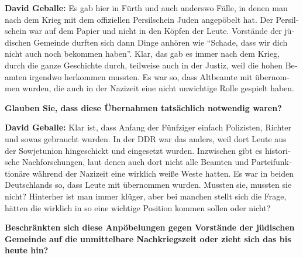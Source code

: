 \begin{otherlanguage}{ngerman}
\textbf{David Geballe:} Es gab hier in Fürth und auch anderswo Fälle, in denen man nach dem Krieg mit dem offiziellen Persilschein Juden angepöbelt hat. Der Persilschein war auf dem Papier und nicht in den Köpfen der Leute. Vorstände der jüdischen Gemeinde durften sich dann Dinge anhören wie "`Schade, dass wir dich nicht auch noch bekommen haben"'. Klar, das gab es immer nach dem Krieg, durch die ganze Geschichte durch, teilweise auch in der Justiz, weil die hohen Beamten irgendwo herkommen mussten. Es war so, dass Altbeamte mit übernommen wurden, die auch in der Nazizeit eine nicht unwichtige Rolle gespielt haben. 

\textbf{Glauben Sie, dass diese Übernahmen tatsächlich notwendig waren?} 

\textbf{David Geballe:} Klar ist, dass Anfang der Fünfziger einfach Polizisten, Richter und sowas gebraucht wurden. In der DDR war das anders, weil dort Leute aus der Sowjetunion hingeschickt und eingesetzt wurden. Inzwischen gibt es historische Nachforschungen, laut denen auch dort nicht alle Beamten und Parteifunktionäre während der Nazizeit eine wirklich weiße Weste hatten. Es war in beiden Deutschlands so, dass Leute mit übernommen wurden. Mussten sie, mussten sie nicht? Hinterher ist man immer klüger, aber bei manchen stellt sich die Frage, hätten die wirklich in so eine wichtige Position kommen sollen oder nicht? 

\textbf{Beschränkten sich diese Anpöbelungen gegen Vorstände der jüdischen Gemeinde auf die unmittelbare Nachkriegszeit oder zieht sich das bis heute hin?} 


\end{otherlanguage}
